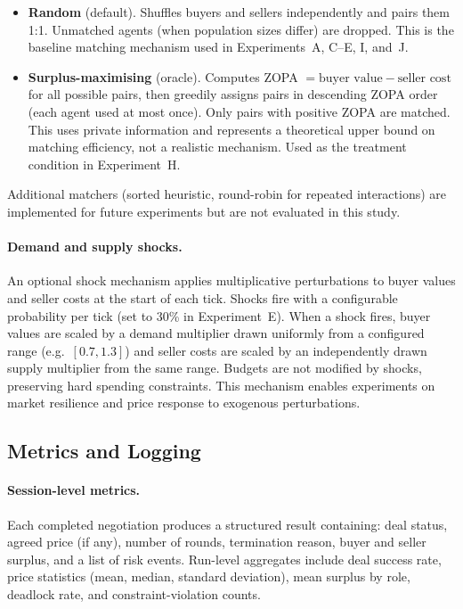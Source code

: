 \begin{itemize}
    \item \textbf{Random} (default).  Shuffles buyers and sellers independently and pairs them 1:1.  Unmatched agents (when population sizes differ) are dropped.  This is the baseline matching mechanism used in Experiments~A, C--E, I, and~J.
    \item \textbf{Surplus-maximising} (oracle).  Computes ZOPA $= \text{buyer value} - \text{seller cost}$ for all possible pairs, then greedily assigns pairs in descending ZOPA order (each agent used at most once).  Only pairs with positive ZOPA are matched.  This uses private information and represents a theoretical upper bound on matching efficiency, not a realistic mechanism.  Used as the treatment condition in Experiment~H.
\end{itemize}

Additional matchers (sorted heuristic, round-robin for repeated interactions) are implemented for future experiments but are not evaluated in this study.

\paragraph{Demand and supply shocks.}
\label{sec:shocks}
An optional shock mechanism applies multiplicative perturbations to buyer values and seller costs at the start of each tick.  Shocks fire with a configurable probability per tick (set to 30\% in Experiment~E).  When a shock fires, buyer values are scaled by a demand multiplier drawn uniformly from a configured range (e.g.\ $[0.7, 1.3]$) and seller costs are scaled by an independently drawn supply multiplier from the same range.  Budgets are not modified by shocks, preserving hard spending constraints.  This mechanism enables experiments on market resilience and price response to exogenous perturbations.

\subsection{Metrics and Logging}
\label{sec:metrics}

\paragraph{Session-level metrics.}
Each completed negotiation produces a structured result containing: deal status, agreed price (if any), number of rounds, termination reason, buyer and seller surplus, and a list of risk events.  Run-level aggregates include deal success rate, price statistics (mean, median, standard deviation), mean surplus by role, deadlock rate, and constraint-violation counts.

